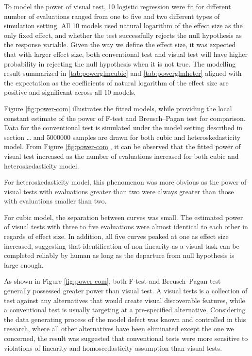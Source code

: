 \documentclass[]{interact}
\theoremstyle{plain}%
\theoremstyle{definition}
\theoremstyle{remark}
\begin{document}
To model the power of visual test, 10 logistic regression were fit for
different number of evaluations ranged from one to five and two
different types of simulation setting. All 10 models used natural
logarithm of the effect size as the only fixed effect, and whether the
test successfully rejects the null hypothesis as the response variable.
Given the way we define the effect size, it was expected that with
larger effect size, both conventional test and visual test will have
higher probability in rejecting the null hypothesis when it is not true.
The modelling result summarized in \ref{tab:powerglmcubic} and
\ref{tab:powerglmheter} aligned with the expectation as the coefficients
of natural logarithm of the effect size are positive and significant
across all 10 models.

Figure \ref{fig:power-com} illustrates the fitted models, while
providing the local constant estimate of the power of F-test and
Breusch--Pagan test for comparison. Data for the conventional test is
simulated under the model setting described in section \ldots{} and
5000000 samples are drawn for both cubic and heteroskedasticity model.
From Figure \ref{fig:power-com}, it can be observed that the fitted
power of visual test increased as the number of evaluations increased
for both cubic and heteroskedasticity model.

For heteroskedasticity model, this phenomenon was more obvious as the
power of visual tests with evaluations greater than two were always
greater than those with evaluations smaller than two.

For cubic model, the separation between curves was small. The estimated
power of visual tests with three to five evaluations were almost
identical to each other in regards of effect size. In addition, all five
curves peaked at one as effect size increased, suggesting that
identification of non-linearity as a visual task can be completed
reliably by human as long as the departure from null hypothesis is large
enough.

As shown in Figure \ref{fig:power-com}, both F-test and Breusch--Pagan
test generally possessed greater power than visual test. A visual tests
is a collection of test against any alternatives that would create
visual discoverable features, while a conventional test is usually
targeting at a pre-specified alternative. Considering the data
generating process of the model defect was known and controlled in this
research, where all other alternatives have been eliminated except the
one we concerned, the result was suggested that conventional tests were
more sensitive to violations of linearity and homoscedasticity
assumption than visual tests.
\end{document}
